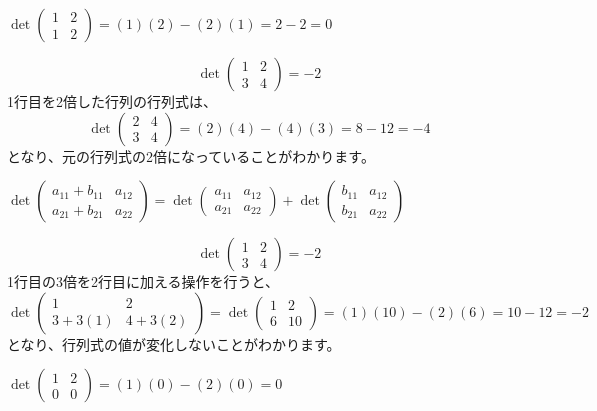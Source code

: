 \begin{ex}
    $\det\begin{pmatrix} 1 & 2 \\ 1 & 2 \end{pmatrix} = (1)(2)-(2)(1) = 2-2=0$
\end{ex}

\begin{ex}
	\[\det\begin{pmatrix} 1 & 2 \\ 3 & 4 \end{pmatrix} = -2\]
    1行目を2倍した行列の行列式は、
    \[\det\begin{pmatrix} 2 & 4 \\ 3 & 4 \end{pmatrix} = (2)(4)-(4)(3) = 8-12=-4\]
    となり、元の行列式の2倍になっていることがわかります。
\end{ex}

\begin{ex}
    $\det\begin{pmatrix} a_{11}+b_{11} & a_{12} \\ a_{21}+b_{21} & a_{22} \end{pmatrix} = \det\begin{pmatrix} a_{11} & a_{12} \\ a_{21} & a_{22} \end{pmatrix} + \det\begin{pmatrix} b_{11} & a_{12} \\ b_{21} & a_{22} \end{pmatrix}$
\end{ex}

\begin{ex}
    \[\det\begin{pmatrix} 1 & 2 \\ 3 & 4 \end{pmatrix} = -2\]
    1行目の3倍を2行目に加える操作を行うと、
    \[\det\begin{pmatrix} 1 & 2 \\ 3+3(1) & 4+3(2) \end{pmatrix} = \det\begin{pmatrix} 1 & 2 \\ 6 & 10 \end{pmatrix} = (1)(10)-(2)(6) = 10-12=-2\]
    となり、行列式の値が変化しないことがわかります。
\end{ex}

\begin{ex}
    $\det\begin{pmatrix} 1 & 2 \\ 0 & 0 \end{pmatrix} = (1)(0)-(2)(0)=0$
\end{ex}

